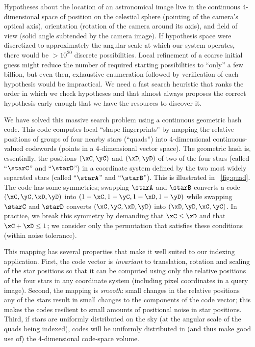 \documentclass[12pt,preprint]{aastex}
\renewcommand{\%}{\percent}
\begin{document}
Hypotheses about the location of an astronomical image live in the
continuous 4-dimensional space of position on the celestial sphere
(pointing of the camera's optical axis), orientation (rotation of the
camera around its axis), and field of view (solid angle subtended by
the camera image).  If hypothesis space were discretized to
approximately the angular scale at which our system operates, there
would be $>10^{20}$ discrete possibilities.  Local refinement of a coarse
initial guess might reduce the number of required starting
possibilities to ``only'' a few billion, but even then, exhaustive
enumeration followed by verification of each hypothesis would be
impractical.  We need a fast search heuristic that ranks the
order in which we check hypotheses and that almost always proposes the
correct hypothesis early enough that we have the resources to discover
it.

We have solved this massive search problem using a continuous
geometric hash code. This code computes local ``shape fingerprints''
by mapping the relative positions of groups of four nearby stars
(``quads'') into 4-dimensional continuous-valued codewords (points in
a 4-dimensional vector space).  The geometric hash is, essentially,
the positions $(\xC,\yC)$ and $(\xD,\yD)$ of two of the four stars
(called ``$\starC$'' and ``$\starD$'')
in a coordinate system defined by the two
most widely separated stars (called ``$\starA$'' and ``$\starB$'').  This is
illustrated in \figurename~\ref{fig:quad}.  The code has some
symmetries; swapping $\starA$ and $\starB$
converts a code $(\xC,\yC,\xD,\yD)$ into
$(1-\xC,1-\yC,1-\xD,1-\yD)$ while swapping $\starC$ and $\starD$ converts
$(\xC,\yC,\xD,\yD)$ into $(\xD,\yD,\xC,\yC)$. In practice, we 
break this symmetry by demanding that $\xC \le \xD$ and that
$\xC + \xD \le 1$; we consider only the permutation that satisfies these
conditions (within noise tolerance).

This mapping has several properties that make it well suited to our
indexing application. First, the code vector is \emph{invariant} to
translation, rotation and scaling of the star positions so that it can
be computed using only the relative positions of the four stars in any
coordinate system (including pixel coordinates in a query image).
Second, the mapping is \emph{smooth}: small changes in the relative
positions any of the stars result in small changes to the components
of the code vector; this makes the codes resilient to small amounts of
positional noise in star positions.  Third, if stars are uniformly
distributed on the sky (at the angular scale of the quads being
indexed), codes will be uniformly distributed in (and thus make
good use of) the 4-dimensional code-space volume.
\end{document}
